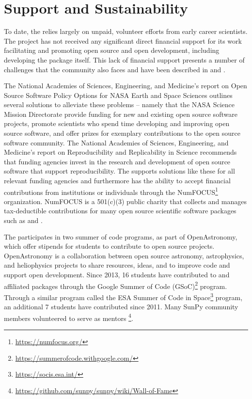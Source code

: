 \section{Support and Sustainability}
\label{sec:support}

To date, the \sunpyproj relies largely on unpaid, volunteer efforts from early career scientists.
The project has not received any significant direct financial support for its work facilitating and promoting open source and open development, including developing the \sunpypkg package itself.
This lack of financial support presents a number of challenges that the \astropy community also faces and have been described in \cite{PriceWhelan:2018ji} and \cite{Muna2016}.

The National Academies of Sciences, Engineering, and Medicine's report on Open Source Software Policy Options for NASA Earth and Space Sciences \citep{NAP2018} outlines several solutions to alleviate these problems -- namely that the NASA Science Mission Directorate provide funding for new and existing open source software projects, promote scientists who spend time developing and improving open source software, and offer prizes for exemplary contributions to the open source software community.
The National Academies of Sciences, Engineering, and Medicine's report on Reproducibility and Replicability in Science \citep{NAP2019} recommends that funding agencies invest in the research and development of open source software that support reproducibility.
The \sunpyproj supports solutions like these for all relevant funding agencies \citep{nas_sunpy_white_paper} and furthermore has the ability to accept financial contributions from institutions or individuals through the NumFOCUS\footnote{\url{https://numfocus.org/}} organization. NumFOCUS is a 501(c)(3) public charity that collects and manages tax-deductible contributions for many open source scientific software packages such as \numpy and \astropy.

The \sunpyproj participates in two summer of code programs, as part of OpenAstronomy, which offer stipends for students to contribute to open source projects. OpenAstronomy is a collaboration between open source astronomy, astrophysics, and heliophysics projects to share resources, ideas, and to improve code and support open development.
Since 2013, 16 students have contributed to \sunpypkg and affiliated packages through the Google Summer of Code (GSoC)\footnote{\url{https://summerofcode.withgoogle.com/}} program.
Through a similar program called the ESA Summer of Code in Space\footnote{\url{https://socis.esa.int/}} program, an additional 7 students have contributed since 2011.
Many SunPy community members volunteered to serve as mentors \footnote{\url{https://github.com/sunpy/sunpy/wiki/Wall-of-Fame}}.
